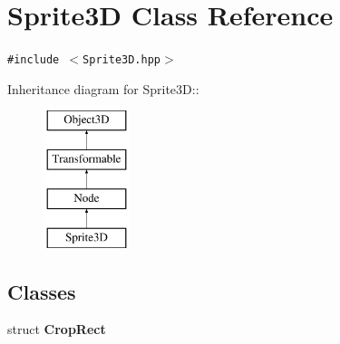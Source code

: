 \hypertarget{classm3g_1_1Sprite3D}{
\section{Sprite3D Class Reference}
\label{classm3g_1_1Sprite3D}
}
{\tt \#include $<$Sprite3D.hpp$>$}

Inheritance diagram for Sprite3D::\begin{figure}[H]
\begin{center}
\leavevmode
\includegraphics[height=4cm]{classm3g_1_1Sprite3D}
\end{center}
\end{figure}
\subsection*{Classes}
\begin{CompactItemize}
\item 
struct \textbf{CropRect}
\end{CompactItemize}
